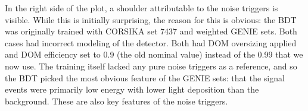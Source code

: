 In the right side of the plot, a shoulder attributable to the noise triggers is visible. 
While this is initially surprising, the reason for this is obvious: the BDT was originally trained with CORSIKA set 7437 and weighted GENIE sets.
Both cases had incorrect modeling of the detector. 
Both had DOM oversizing applied and DOM efficiency set to 0.9 (the old nominal value) instead of the 0.99 that we now use. 
The training itself lacked any pure noise triggers as a reference, and so the BDT picked the most obvious feature of the GENIE sets: that the signal events were primarily low energy with lower light deposition than the background. 
These are also key features of the noise triggers. 
